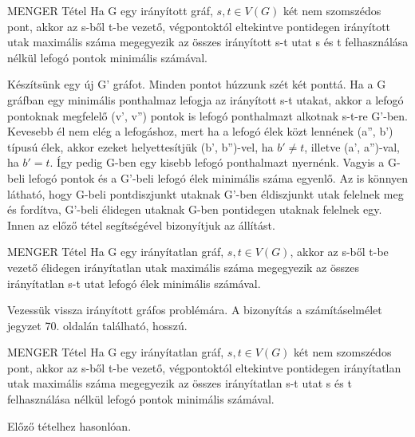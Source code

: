 \begin{tetel}{MENGER Tétel}
Ha G egy irányított gráf, $s,t\in V(G)$ két nem szomszédos pont, akkor az s-ből t-be vezető, végpontoktól eltekintve pontidegen irányított utak maximális száma megegyezik az összes irányított s-t utat s és t felhasználása nélkül lefogó pontok minimális számával.
\end{tetel}

\begin{bizonyitas}{}
Készítsünk egy új G' gráfot. Minden pontot húzzunk szét két ponttá. Ha a G gráfban egy minimális ponthalmaz lefogja az irányított s-t utakat, akkor a lefogó pontoknak megfelelő (v', v'') pontok is lefogó ponthalmazt alkotnak s-t-re G'-ben. Kevesebb él nem elég a lefogáshoz, mert ha a lefogó élek közt lennének (a'', b') típusú élek, akkor ezeket helyettesítjük (b', b'')-vel, ha $b' \neq t$, illetve (a', a'')-val, ha $b' = t$. Így pedig G-ben egy kisebb lefogó ponthalmazt nyernénk. Vagyis a G-beli lefogó pontok és a G'-beli lefogó élek minimális száma egyenlő. Az is könnyen látható, hogy G-beli pontdiszjunkt utaknak G'-ben éldiszjunkt utak felelnek meg és fordítva, G'-beli élidegen utaknak G-ben pontidegen utaknak felelnek egy. Innen az előző tétel segítségével bizonyítjuk az állítást.
\end{bizonyitas}

\begin{tetel}{MENGER Tétel}
Ha G egy irányítatlan gráf, $s,t\in V(G)$, akkor az s-ből t-be vezető élidegen irányítatlan utak maximális száma megegyezik az összes irányítatlan s-t utat lefogó élek minimális számával.
\end{tetel}

\begin{bizonyitas}{}
Vezessük vissza irányított gráfos problémára. A bizonyítás a számításelmélet jegyzet 70. oldalán található, hosszú.
\end{bizonyitas}

\begin{tetel}{MENGER Tétel}
Ha G egy irányítatlan gráf, $s,t\in V(G)$ két nem szomszédos pont, akkor az s-ből t-be vezető, végpontoktól eltekintve pontidegen irányítatlan utak maximális száma megegyezik az összes irányítatlan s-t utat s és t felhasználása nélkül lefogó pontok minimális számával.
\end{tetel}

\begin{bizonyitas}{}
Előző tételhez hasonlóan.
\end{bizonyitas}

